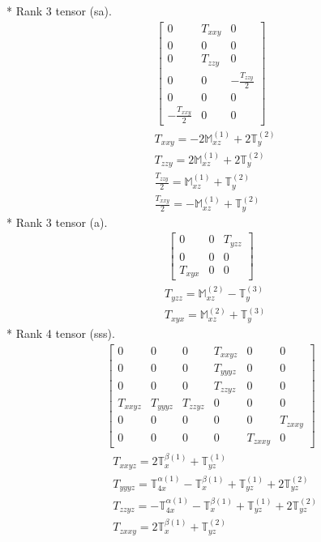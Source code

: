 \documentclass[fleqn,8pt,landscape]{jsarticle}
\begin{document}
* Rank 3 tensor (sa).
\begin{align*}
\begin{bmatrix} 0 & T_{xxy} & 0 \\ 0 & 0 & 0 \\ 0 & T_{zzy} & 0 \\ 0 & 0 & - \frac{T_{zzy}}{2} \\ 0 & 0 & 0 \\ - \frac{T_{xxy}}{2} & 0 & 0 \end{bmatrix}
\end{align*}
\begin{align*}
& T_{xxy} = - 2 \mathbb{M}_{xz}^{(1)} + 2 \mathbb{T}_{y}^{(2)} \\
& T_{zzy} = 2 \mathbb{M}_{xz}^{(1)} + 2 \mathbb{T}_{y}^{(2)} \\
& \frac{T_{zzy}}{2} = \mathbb{M}_{xz}^{(1)} + \mathbb{T}_{y}^{(2)} \\
& \frac{T_{xxy}}{2} = - \mathbb{M}_{xz}^{(1)} + \mathbb{T}_{y}^{(2)}
\end{align*}
* Rank 3 tensor (a).
\begin{align*}
\begin{bmatrix} 0 & 0 & T_{yzz} \\ 0 & 0 & 0 \\ T_{xyx} & 0 & 0 \end{bmatrix}
\end{align*}
\begin{align*}
& T_{yzz} = \mathbb{M}_{xz}^{(2)} - \mathbb{T}_{y}^{(3)} \\
& T_{xyx} = \mathbb{M}_{xz}^{(2)} + \mathbb{T}_{y}^{(3)}
\end{align*}
* Rank 4 tensor (sss).
\begin{align*}
\begin{bmatrix} 0 & 0 & 0 & T_{xxyz} & 0 & 0 \\ 0 & 0 & 0 & T_{yyyz} & 0 & 0 \\ 0 & 0 & 0 & T_{zzyz} & 0 & 0 \\ T_{xxyz} & T_{yyyz} & T_{zzyz} & 0 & 0 & 0 \\ 0 & 0 & 0 & 0 & 0 & T_{zxxy} \\ 0 & 0 & 0 & 0 & T_{zxxy} & 0 \end{bmatrix}
\end{align*}
\begin{align*}
& T_{xxyz} = 2 \mathbb{T}_{x}^{\beta(1)} + \mathbb{T}_{yz}^{(1)} \\
& T_{yyyz} = \mathbb{T}_{4x}^{\alpha(1)} - \mathbb{T}_{x}^{\beta(1)} + \mathbb{T}_{yz}^{(1)} + 2 \mathbb{T}_{yz}^{(2)} \\
& T_{zzyz} = - \mathbb{T}_{4x}^{\alpha(1)} - \mathbb{T}_{x}^{\beta(1)} + \mathbb{T}_{yz}^{(1)} + 2 \mathbb{T}_{yz}^{(2)} \\
& T_{zxxy} = 2 \mathbb{T}_{x}^{\beta(1)} + \mathbb{T}_{yz}^{(2)}
\end{align*}
\end{document}
